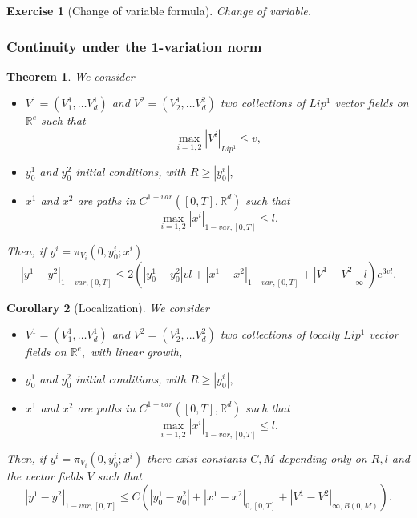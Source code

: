 \documentclass{article}
\newcommand{\R}{\mathbb{R}}
\newtheorem{theorem}{Theorem}
\newtheorem{exercise}{Exercise}
\newtheorem{corollary}[theorem]{Corollary}
\begin{document}
\begin{exercise}[Change of variable formula]
    Change of variable.
\end{exercise}

\subsubsection{Continuity under the 1-variation norm}

\begin{theorem}
    We consider
    \begin{itemize}
        \item $V^1 = (V_1^1, \ldots V^1_d)$ and $V^2 = (V_2^1, \ldots V^2_d)$ two collections of $Lip^1$ vector fields on $\R^e$ such that
        \begin{equation}
            \max_{i=1,2} |V^i|_{Lip^1} \leq v,
        \end{equation}
        \item $y_0^1$ and $y_0^2$ initial conditions, with $R \geq |y_0^i|,$
        \item $x^1$ and $x^2$ are paths in $C^{1-var}([0,T], \R^d)$ such that 
        \begin{equation}
            \max_{i=1,2} |x^i|_{1-var, [0,T]} \leq l.
        \end{equation} 
    \end{itemize}

    Then, if $y^i = \pi_{V_i}(0, y_0^i; x^i)$
    \begin{equation}
        |y^1 - y^2|_{1-var,[0,T]} \leq 2 \left( |y_0^1 - y_0^2| v l + |x^1 - x^2|_{1-var,[0,T]} + |V^1 - V^2|_\infty l \right) e^{3vl}.
    \end{equation}
\end{theorem}

\begin{corollary}[Localization]
        We consider
    \begin{itemize}
        \item $V^1 = (V_1^1, \ldots V^1_d)$ and $V^2 = (V_2^1, \ldots V^2_d)$ two collections of locally $Lip^1$ vector fields on $\R^e,$ with linear growth,
        \item $y_0^1$ and $y_0^2$ initial conditions, with $R \geq |y_0^i|,$
        \item $x^1$ and $x^2$ are paths in $C^{1-var}([0,T], \R^d)$ such that 
        \begin{equation}
            \max_{i=1,2} |x^i|_{1-var, [0,T]} \leq l.
        \end{equation} 
    \end{itemize}

    Then, if $y^i = \pi_{V_i}(0, y_0^i; x^i)$ there exist constants $C, M$ depending only on $R, l$ and the vector fields $V$ such that
    \begin{equation}
        |y^1 - y^2|_{1-var,[0,T]} \leq C \left( |y_0^1 - y_0^2| + |x^1 - x^2|_{0,[0,T]} + |V^1 - V^2|_{\infty, B(0,M)} \right).
    \end{equation}
\end{corollary}
\end{document}
